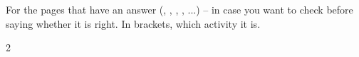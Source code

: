 \section*{\lblClave}

For the pages that have an answer (\lblRodea, \lblCuenta, \lblBusca,
\lblUne, \lblCompleta...) -- in case you want to check before saying
whether it is right. In brackets, which activity it is.

\begin{multicols}{2}
\footnotesize
\begin{itemize}[leftmargin=0mm, label={}, itemsep=2mm, topsep=0mm]

\end{itemize}
\end{multicols}
\newpage
